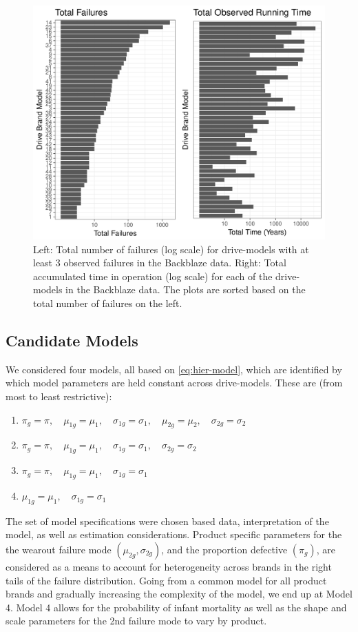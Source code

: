 \documentclass[12pt]{article}
\begin{document}
\begin{figure}[H]
  \includegraphics[width=.9\textwidth]{fig/data-sum.pdf}
  \caption{Left: Total number of failures (log scale) for drive-models with at least 3 observed failures in the Backblaze data. Right: Total accumulated time in operation (log scale) for each of the drive-models in the Backblaze data.  The plots are sorted based on the total number of failures on the left.}
  \label{fig1}
\end{figure}

\subsection{Candidate Models}
We considered four models, all based on \ref{eq:hier-model}, which are identified by which model parameters are held constant across drive-models. These are (from most to least restrictive):

\begin{enumerate}
\item $\pi_{g} = \pi,\quad \mu_{1g} = \mu_1,\quad \sigma_{1g}=\sigma_1,\quad \mu_{2g} = \mu_2,\quad \sigma_{2g} = \sigma_2$
\item $\pi_{g} = \pi,\quad \mu_{1g} = \mu_1,\quad \sigma_{1g}=\sigma_1,\quad \sigma_{2g} = \sigma_2$
\item $\pi_{g} = \pi,\quad \mu_{1g} = \mu_1,\quad \sigma_{1g}=\sigma_1$
\item $\mu_{1g} = \mu_1,\quad \sigma_{1g}=\sigma_1$
\end{enumerate}

The set of model specifications were chosen based data, interpretation of the model, as well as estimation considerations.  Product specific parameters for the the wearout failure mode $(\mu_{2g},\sigma_{2g})$, and the proportion defective $(\pi_g)$, are considered as a means to account for heterogeneity across brands in the right tails of the failure distribution.  Going from a common model for all product brands and gradually increasing the complexity of the model, we end up at Model 4.  Model 4 allows for the probability of infant mortality as well as the shape and scale parameters for the 2nd failure mode to vary by product.
\end{document}
